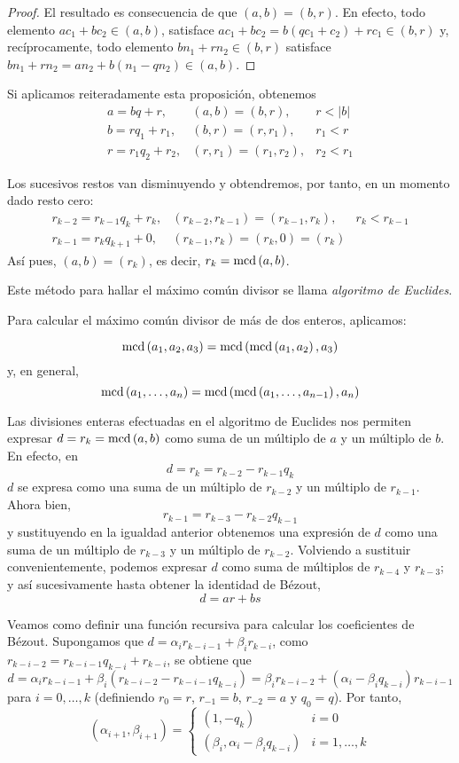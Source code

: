 \begin{proof}
    El resultado es consecuencia de que $(a,b)=(b,r)$. En efecto, todo elemento $ac_1+bc_2\in (a,b)$, satisface $ac_1+bc_2=b(qc_1+c_2)+rc_1\in (b,r)$ y, recíprocamente, todo elemento $bn_1+rn_2\in(b,r)$ satisface $bn_1+rn_2=an_2+b(n_1-qn_2)\in (a,b)$.
\end{proof}

Si aplicamos reiteradamente esta proposición, obtenemos
$$\begin{array}{lll}
    a = bq + r,       & (a,b)=(b,r),       & r<|b|   \\
    b = rq_1 + r_1,   & (b,r)=(r,r_1),     & r_1<r   \\
    r = r_1q_2 + r_2, & (r,r_1)=(r_1,r_2), & r_2<r_1
\end{array}$$

Los sucesivos restos van disminuyendo y obtendremos, por tanto, en un momento dado resto cero:
$$\begin{array}{lll}
    r_{k-2} = r_{k-1}q_k + r_k, & (r_{k-2},r_{k-1})=(r_{k-1},r_k),  & r_k<r_{k-1}   \\
    r_{k-1} = r_kq_{k+1} + 0,   & (r_{k-1},r_k)=(r_k,0)=(r_k)       & 
\end{array}$$
Así pues, $(a,b)=(r_k)$, es decir, $r_k=\operatorname{\rm mcd}\left(a,b\right)$.

Este método para hallar el máximo común divisor se llama {\it algoritmo de Euclides}.

Para calcular el máximo común divisor de más de dos enteros, aplicamos:

\begin{ejer}
    $$\operatorname{\rm mcd}\left(a_1,a_2,a_3\right)=\operatorname{\rm mcd}\left(\operatorname{\rm mcd}\left(a_1,a_2\right),a_3\right)$$
    y, en general,
    $$\operatorname{\rm mcd}\left(a_1,\dots,a_n\right)=\operatorname{\rm mcd}\left(\operatorname{\rm mcd}\left(a_1,\dots,a_{n-1}\right),a_n\right)$$
\end{ejer}

Las divisiones enteras efectuadas en el algoritmo de Euclides nos permiten expresar $d=r_k=\operatorname{\rm mcd}\left(a,b\right)$ como suma de un múltiplo de $a$ y un múltiplo de $b$. En efecto, en
$$d=r_k=r_{k-2}-r_{k-1}q_k$$
$d$ se expresa como una suma de un múltiplo de $r_{k-2}$ y un múltiplo de $r_{k-1}$. Ahora bien, 
$$r_{k-1}=r_{k-3}-r_{k-2}q_{k-1}$$
y sustituyendo en la igualdad anterior obtenemos una expresión de $d$ como una suma de un múltiplo de $r_{k-3}$ y un múltiplo de $r_{k-2}$. Volviendo a sustituir convenientemente, podemos expresar $d$ como suma de múltiplos de $r_{k-4}$ y $r_{k-3}$; y así sucesivamente hasta obtener la identidad de Bézout,
$$d=ar+bs$$

\begin{reader}
    Veamos como definir una función recursiva para calcular los coeficientes de Bézout. Supongamos que $d=\alpha_i r_{k-i-1} + \beta_i r_{k-i}$, como $r_{k-i-2}=r_{k-i-1}q_{k-i}+r_{k-i}$, se obtiene que
    $$d=\alpha_i r_{k-i-1}+\beta_i(r_{k-i-2}-r_{k-i-1}q_{k-i})=\beta_i r_{k-i-2}+(\alpha_i -\beta_i q_{k-i})r_{k-i-1} $$
    para $i=0,\dots,k$ (definiendo $r_0=r$, $r_{-1}=b$, $r_{-2}=a$ y $q_0=q$). Por tanto,
    $$(\alpha_{i+1},\beta_{i+1})=\begin{cases}
        (1, -q_k) & i=0 \\
        (\beta_i, \alpha_i-\beta_iq_{k-i}) & i = 1,\dots,k
    \end{cases}$$
\end{reader}

